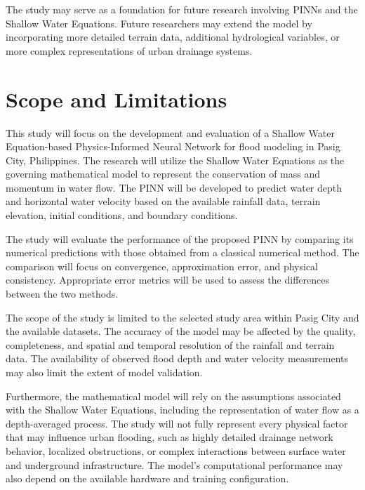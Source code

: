 The study may serve as a foundation for future research involving PINNs and the Shallow Water Equations. Future researchers may extend the model by incorporating more detailed terrain data, additional hydrological variables, or more complex representations of urban drainage systems.

\section{Scope and Limitations}



This study will focus on the development and evaluation of a Shallow Water Equation-based Physics-Informed Neural Network for flood modeling in Pasig City, Philippines. The research will utilize the Shallow Water Equations as the governing mathematical model to represent the conservation of mass and momentum in water flow. The PINN will be developed to predict water depth and horizontal water velocity based on the available rainfall data, terrain elevation, initial conditions, and boundary conditions.

The study will evaluate the performance of the proposed PINN by comparing its numerical predictions with those obtained from a classical numerical method. The comparison will focus on convergence, approximation error, and physical consistency. Appropriate error metrics will be used to assess the differences between the two methods.

The scope of the study is limited to the selected study area within Pasig City and the available datasets. The accuracy of the model may be affected by the quality, completeness, and spatial and temporal resolution of the rainfall and terrain data. The availability of observed flood depth and water velocity measurements may also limit the extent of model validation.

Furthermore, the mathematical model will rely on the assumptions associated with the Shallow Water Equations, including the representation of water flow as a depth-averaged process. The study will not fully represent every physical factor that may influence urban flooding, such as highly detailed drainage network behavior, localized obstructions, or complex interactions between surface water and underground infrastructure. The model's computational performance may also depend on the available hardware and training configuration.


